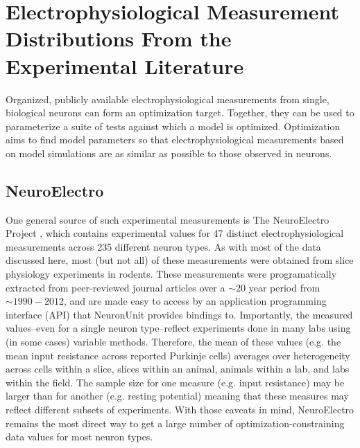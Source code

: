 \section{Electrophysiological Measurement Distributions From the Experimental Literature}
\label{sec:data-sources}
Organized, publicly available electrophysiological measurements from single, biological neurons can form an optimization target.
Together, they can be used to parameterize a suite of tests against which a model is optimized.
Optimization aims to find model parameters so that electrophysiological measurements based on model simulations are as similar as possible to those observed in neurons.

\subsection{NeuroElectro}
\label{sec:neuroelectro}
One general source of such experimental measurements is The NeuroElectro Project \citep{tripathy2014neuroelectro}, which contains experimental values for 47 distinct electrophysiological measurements across 235 different neuron types.
As with most of the data discussed here, most (but not all) of these measurements were obtained from slice physiology experiments in rodents.
These measurements were programatically extracted from peer-reviewed journal articles over a $\sim20$ year period from $\sim1990-2012$,
and are made easy to access by an application programming interface (API) that NeuronUnit provides bindings to.
Importantly, the measured values--even for a single neuron type--reflect experiments done in many labs using (in some cases) variable methods.
Therefore, the mean of these values (e.g. the mean input resistance across reported Purkinje cells) averages over heterogeneity across cells within a slice, slices within an animal, animals within a lab, and labs within the field.
The sample size for one measure (e.g. input resistance) may be larger than for another (e.g. resting potential) meaning that these measures may reflect different subsets of experiments.
With those caveats in mind, NeuroElectro remains the most direct way to get a large number of optimization-constraining data values for most neuron types.

